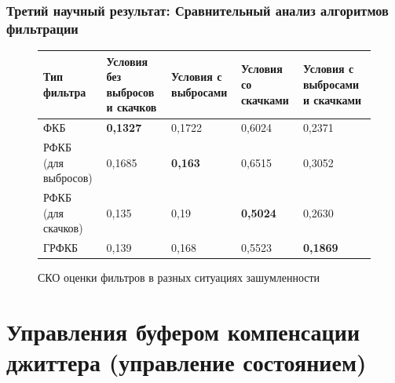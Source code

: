 \documentclass[10pt,pdf,hyperref={unicode}]{beamer}
\begin{document}
\begin{frame}
\frametitle{Третий научный результат: Сравнительный анализ алгоритмов фильтрации}
\begin{scriptsize}

\pgfplotsset{width=10cm, height=4cm, compat=newest}
\begin{figure} [!h]
  \center
{}
\caption*{СКО оценки фильтров в разных ситуациях зашумленности}


\begin{tabular}{|p{1.5cm}|p{1.5cm}|p{1.5cm}|p{1.5cm}|p{1.5cm}|}
    \hline
    Тип фильтра        & Условия без выбросов и скачков & Условия с выбросами & Условия со скачками  & Условия с выбросами и скачками \\ \hline
    ФКБ                 & \textbf{0,1327}                 & 0,1722                   & 0,6024                 & 0,2371                           \\ \hline
    РФКБ (для выбросов) & 0,1685                          &  \textbf{0,163}       & 0,6515                 & 0,3052                           \\ \hline
    РФКБ (для скачков)   & 0,135                           & 0,19               & \textbf{0,5024}                & 0,2630                             \\ \hline
    ГРФКБ               & 0,139                          & 0,168               &   0,5523            & \textbf{0,1869}                           \\ \hline
    \end{tabular}
\end{figure}
\end{scriptsize}
\end{frame}


\section{Управления буфером компенсации джиттера (управление состоянием)}
\end{document}
